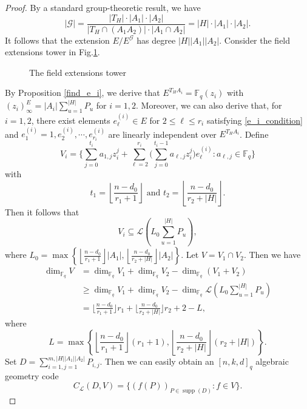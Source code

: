 \documentclass[journal,12pt,onecolumn]{IEEEtran}
\begin{document}
\begin{proof}
    By a standard group-theoretic result, we have
    \[
        |\mathcal{G}| = \frac{|T_H|\cdot|A_1| \cdot |A_2|}{|T_H\cap (A_1A_2)|\cdot|A_1 \cap A_2|} = |H|\cdot|A_1| \cdot |A_2|.
    \]
    It follows that the extension \( E/E^{\mathcal{G}} \) has degree \(|H||A_1| |A_2|\). Consider the field extensions tower in Fig.\ref{extension}. 
    \begin{figure}[htbp]
        \centering
        \caption{The field extensions tower}
        \label{extension}
    \end{figure}
    
    By Proposition \ref{find_e_i}, we derive that \(E^{T_H A_i} = \mathbb{F}_q(z_i)\) with \((z_i)^E_\infty = |A_i|\sum_{u = 1}^{|H|} P_u\) for \(i = 1,2\). Moreover, we can also derive that, for \(i = 1,2\), there exist elements \( e_\ell^{(i)} \in E \) for \( 2\le \ell\le r_i \) satisfying \eqref{e_i_condition} and \( e^{(i)}_1 = 1, e^{(i)}_2, \cdots, e^{(i)}_{r_i} \) are linearly independent over \( E^{T_HA_i} \). Define 
    \[
        V_i = \Bigg\{ \sum_{j=0}^{t_i}a_{1,j}z_i^j+\sum_{\ell=2}^{r_i}\bigg(\sum_{j=0}^{t_i-1}a_{\ell,j}z_i^j\bigg)e^{(i)}_\ell:a_{\ell,j}\in\mathbb{F}_q \Bigg\}
    \]
    with
    \[
        t_1 = \left\lfloor\frac{n-d_0}{r_1 + 1}\right\rfloor \text{ and }t_2 = \left\lfloor\frac{n-d_0}{r_2 + |H|}\right\rfloor. 
    \]
    Then it follows that 
    \[
        V_i \subseteq \mathcal{L}\left( L_0 \sum_{u = 1}^{|H|} P_u\right),  
    \]
    where \(L_0 = \max\left\{\left\lfloor\frac{n-d_0}{r_1 + 1}\right\rfloor |A_1|,\left\lfloor\frac{n-d_0}{r_2 + |H|}\right\rfloor |A_2|\right\}\). Let \(V = V_1\cap V_2\). Then we have
    \begin{align*}
        \dim_{\mathbb{F}_q} V &= \dim_{\mathbb{F}_q}V_1 + \dim_{\mathbb{F}_q}V_2 - \dim_{\mathbb{F}_q}(V_1 + V_2) \\ 
        &\ge \dim_{\mathbb{F}_q}V_1 + \dim_{\mathbb{F}_q}V_2  - \dim_{\mathbb{F}_q}\mathcal{L}\left( L_0 \sum_{u = 1}^{|H|} P_u\right) \\ 
        &=  \bigg\lfloor\frac{n-d_0}{r_1 + 1}\bigg\rfloor r_1 + \bigg\lfloor\frac{n-d_0}{r_2 + |H|}\bigg\rfloor r_2 + 2  - L, 
    \end{align*}
    where
    \[
        L =  \max\left\{\left\lfloor\frac{n-d_0}{r_1 + 1}\right\rfloor (r_1+1),\left\lfloor\frac{n-d_0}{r_2 + |H|}\right\rfloor (r_2 + |H|)\right\}.  
    \]
    Set \( D = \sum_{i=1,j=1}^{m,|H||A_1||A_2|}P_{i,j} \). Then we can easily obtain an \([n, k, d]_q\) algebraic geometry code
    \[
       C_{\mathcal{L}}(D,V)=\big\{(f(P))_{P\in\operatorname{supp}(D)}:f\in V\big\}. 
    \]
    

\end{proof}
\end{document}
